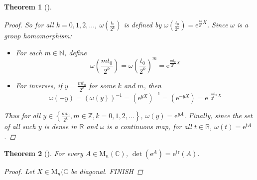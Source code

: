\documentclass[letterpaper, 10pt]{article}
\theoremstyle{theostyle}
\newtheorem{theorem}{Theorem}[section]
\newenvironment{thmstyle}[1][]{%
    \begin{theorem}[#1]\leavevmode\vspace{-\baselineskip}\myquote%
    }{\endmyquote\end{theorem}}
\begin{document}
\begin{thmstyle}
\begin{proof}
        So for all \(k = 0, 1, 2, \dots\), \(\omega \left(\frac{t_0}{2^k}\right)\) is defined by \(\omega \left(\frac{t_0}{2^k}\right) = \mathrm{e}^{\frac{t_0}{2^k}X}\).
        Since \(\omega\) is a group homomorphism:
        \begin{itemize}
            \item For each \(m \in \mathbb{N}\), define 
            \[\omega \left(\frac{mt_0}{2^k}\right) = \omega \left(\frac{t_0}{2^k}\right)^m = \mathrm{e}^{\frac{mt_0}{2^k}X}\]
            \item For inverses, if \(y = \frac{mt_0}{2^k}\) for some \(k\) and \(m\), then
            \[\omega (-y) = \left(\omega(y)\right)^{-1} = \left( \mathrm{e}^{yX}\right)^{-1} = \left( \mathrm{e}^{-yX}\right) = \mathrm{e}^{\frac{ - mt_0}{2^k}X}\]
        \end{itemize}
        Thus for all \(y \in \left\{\frac{mt_0}{2^k}, m \in \mathbb{Z}, k = 0, 1, 2, \dots\right\}\), \(\omega (y) = \mathrm{e}^{yA}\).
        Finally, since the set of all such \(y\) is dense in \(\mathbb{R}\) and \(\omega\) is a continuous map,
        for all \(t \in \mathbb{R}\), \(\omega (t) = \mathrm{e}^{tA}\).
    \end{proof}
\end{thmstyle}

\begin{thmstyle}
    For every \(A \in \mathrm{M}_n(\mathbb{C})\), \(\det(\mathrm{e}^A) = \mathrm{e}^{\operatorname{tr}}{(A)}\).
    \begin{proof}
        Let \(X \in \mathrm{M}_n (\mathbb{C}\) be diagonal.
        FINISH
    \end{proof}
\end{thmstyle}
\end{document}
